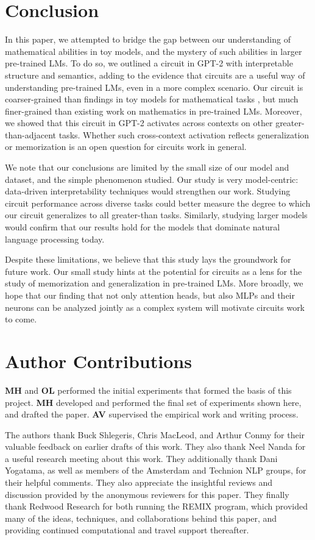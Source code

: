 \documentclass{article}
\begin{document}
    \section{Conclusion}
    In this paper, we attempted to bridge the gap between our understanding of mathematical abilities in toy models, and the mystery of such abilities in larger pre-trained LMs. To do so, we outlined a circuit in GPT-2 with interpretable structure and semantics, adding to the evidence that circuits are a useful way of understanding pre-trained LMs, \citep{wang2023interpretability} even in a more complex scenario. Our circuit is coarser-grained than findings in toy models for mathematical tasks \citep{nanda2023progress}, but much finer-grained than existing work on mathematics in pre-trained LMs. Moreover, we showed that this circuit in GPT-2 activates across contexts on other greater-than-adjacent tasks. Whether such cross-context activation reflects generalization or memorization is an open question for circuits work in general.
    
    We note that our conclusions are limited by the small size of our model and dataset, and the simple phenomenon studied. Our study is very model-centric: data-driven interpretability techniques would strengthen our work. Studying circuit performance across diverse tasks could better measure the degree to which our circuit generalizes to all greater-than tasks. Similarly, studying larger models would confirm that our results hold for the models that dominate natural language processing today.

    Despite these limitations, we believe that this study lays the groundwork for future work. Our small study hints at the potential for circuits as a lens for the study of memorization and generalization in pre-trained LMs. More broadly, we hope that our finding that not only attention heads, but also MLPs and their neurons can be analyzed jointly as a complex system will motivate circuits work to come.


    \section*{Author Contributions}
    \textbf{MH} and \textbf{OL} performed the initial experiments that formed the basis of this project. \textbf{MH} developed and performed the final set of experiments shown here, and drafted the paper. \textbf{AV} supervised the empirical work and writing process.


    \begin{ack}
        The authors thank Buck Shlegeris, Chris MacLeod, and Arthur Conmy for their valuable feedback on earlier drafts of this work. They also thank Neel Nanda for a useful research meeting about this work. They additionally thank Dani Yogatama, as well as members of the Amsterdam and Technion NLP groups, for their helpful comments. They also appreciate the insightful reviews and discussion provided by the anonymous reviewers for this paper. They finally thank Redwood Research for both running the REMIX program, which provided many of the ideas, techniques, and collaborations behind this paper, and providing continued computational and travel support thereafter.
    \end{ack}
    
\end{document}
